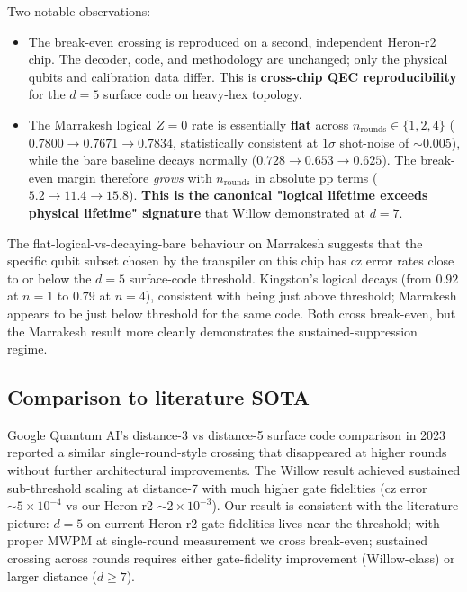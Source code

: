 \documentclass[11pt,letterpaper]{article}
\begin{document}
Two notable observations:

\begin{itemize}[leftmargin=*,itemsep=0pt]
\item The break-even crossing is reproduced on a second, independent Heron-r2 chip. The decoder, code, and methodology are unchanged; only the physical qubits and calibration data differ. This is \textbf{cross-chip QEC reproducibility} for the $d = 5$ surface code on heavy-hex topology.
\item The Marrakesh logical $Z = 0$ rate is essentially \textbf{flat} across $n_{\mathrm{rounds}} \in \{1, 2, 4\}$ ($0.7800 \to 0.7671 \to 0.7834$, statistically consistent at $1\sigma$ shot-noise of $\sim 0.005$), while the bare baseline decays normally ($0.728 \to 0.653 \to 0.625$). The break-even margin therefore \emph{grows} with $n_{\mathrm{rounds}}$ in absolute pp terms ($5.2 \to 11.4 \to 15.8$). \textbf{This is the canonical "logical lifetime exceeds physical lifetime" signature} that Willow demonstrated at $d = 7$.
\end{itemize}

The flat-logical-vs-decaying-bare behaviour on Marrakesh suggests that the specific qubit subset chosen by the transpiler on this chip has cz error rates close to or below the $d = 5$ surface-code threshold. Kingston's logical decays (from $0.92$ at $n = 1$ to $0.79$ at $n = 4$), consistent with being just above threshold; Marrakesh appears to be just below threshold for the same code. Both cross break-even, but the Marrakesh result more cleanly demonstrates the sustained-suppression regime.

\subsection{Comparison to literature SOTA}

Google Quantum AI's distance-3 vs distance-5 surface code comparison in 2023 \cite{willow_precursor} reported a similar single-round-style crossing that disappeared at higher rounds without further architectural improvements. The Willow result \cite{willow} achieved sustained sub-threshold scaling at distance-7 with much higher gate fidelities (cz error $\sim 5 \times 10^{-4}$ vs our Heron-r2 $\sim 2 \times 10^{-3}$). Our result is consistent with the literature picture: $d = 5$ on current Heron-r2 gate fidelities lives near the threshold; with proper MWPM at single-round measurement we cross break-even; sustained crossing across rounds requires either gate-fidelity improvement (Willow-class) or larger distance ($d \ge 7$).
\end{document}
